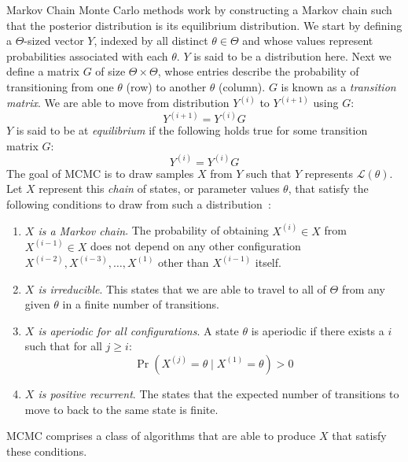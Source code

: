 Markov Chain Monte Carlo methods work by constructing a Markov chain such that the posterior distribution is its
equilibrium distribution.
We start by defining a $\Theta$-sized vector $Y$, indexed by all distinct $\theta \in \Theta$ and whose values represent
probabilities associated with each $\theta$.
$Y$ is said to be a distribution here.
Next we define a matrix $G$ of size $\Theta \times \Theta$, whose entries describe the probability of transitioning
from one $\theta$ (row) to another $\theta$ (column).
$G$ is known as a \emph{transition matrix}.
We are able to move from distribution $Y^{(i)}$ to $Y^{(i + 1)}$ using $G$:
\begin{equation}
    Y^{(i + 1)} = Y^{(i)} G
\end{equation}
$Y$ is said to be at \emph{equilibrium} if the following holds true for some transition matrix $G$:
\begin{equation}
    Y^{(i)} = Y^{(i)} G
\end{equation}
The goal of MCMC is to draw samples $X$ from $Y$ such that $Y$ represents $\mathcal{L}(\theta)$.
Let $X$ represent this \emph{chain} of states, or parameter values $\theta$, that satisfy the following
conditions to draw from such a distribution~\cite{hanadaMarkovChainMonte2018}:
\begin{enumerate}
    \item \emph{$X$ is a Markov chain}.
        The probability of obtaining $X^{(i)} \in X$ from $X^{(i - 1)} \in X$ does not depend on any other configuration
        $X^{(i - 2)}, X^{(i - 3)}, \ldots, X^{(1)}$ other than $X^{(i - 1)}$ itself.
    \item \emph{$X$ is irreducible}.
        This states that we are able to travel to all of $\Theta$ from any given $\theta$ in a finite number of
        transitions.
    \item \emph{$X$ is aperiodic for all configurations}.
        A state $\theta$ is aperiodic if there exists a $i$ such that for all $j \geq i$:
        \begin{equation}
            \Pr \left( X^{(j)} = \theta \mid X^{(1)} = \theta \right) > 0
        \end{equation}
    \item \emph{$X$ is positive recurrent}.
        The states that the expected number of transitions to move to back to the same state is finite.
\end{enumerate}
MCMC comprises a class of algorithms that are able to produce $X$ that satisfy these conditions.

